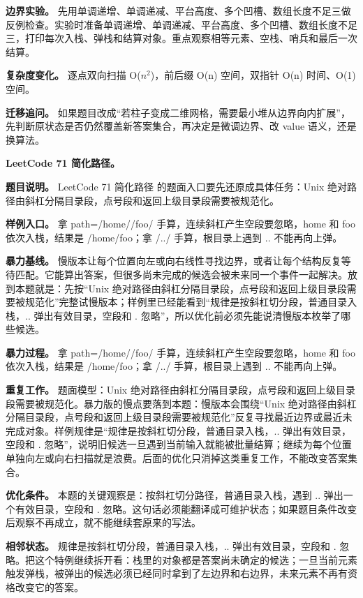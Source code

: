 \textbf{边界实验。} 先用单调递增、单调递减、平台高度、多个凹槽、数组长度不足三做反例检查。实验时准备单调递增、单调递减、平台高度、多个凹槽、数组长度不足三，打印每次入栈、弹栈和结算对象。重点观察相等元素、空栈、哨兵和最后一次结算。

\textbf{复杂度变化。} 逐点双向扫描 O(\ensuremath{n^{2}})，前后缀 O(n) 空间，双指针 O(n) 时间、O(1) 空间。

\textbf{迁移追问。} 如果题目改成“若柱子变成二维网格，需要最小堆从边界向内扩展”，先判断原状态是否仍然覆盖新答案集合，再决定是微调边界、改 value 语义，还是换算法。

\noindent\textbf{LeetCode 71 简化路径。}

\textbf{题目说明。} LeetCode 71 简化路径 的题面入口要先还原成具体任务：Unix 绝对路径由斜杠分隔目录段，点号段和返回上级目录段需要被规范化。

\textbf{样例入口。} 拿 path=/home//foo/ 手算，连续斜杠产生空段要忽略，home 和 foo 依次入栈，结果是 /home/foo；拿 /../ 手算，根目录上遇到 .. 不能再向上弹。

\textbf{暴力基线。} 慢版本让每个位置向左或向右线性寻找边界，或者让每个结构反复等待匹配。它能算出答案，但很多尚未完成的候选会被未来同一个事件一起解决。放到本题就是：先按“Unix 绝对路径由斜杠分隔目录段，点号段和返回上级目录段需要被规范化”完整试慢版本；样例里已经能看到“规律是按斜杠切分段，普通目录入栈，.. 弹出有效目录，空段和 . 忽略”，所以优化前必须先能说清慢版本枚举了哪些候选。

\textbf{暴力过程。} 拿 path=/home//foo/ 手算，连续斜杠产生空段要忽略，home 和 foo 依次入栈，结果是 /home/foo；拿 /../ 手算，根目录上遇到 .. 不能再向上弹。

\textbf{重复工作。} 题面模型：Unix 绝对路径由斜杠分隔目录段，点号段和返回上级目录段需要被规范化。暴力版的慢点要落到本题：慢版本会围绕“Unix 绝对路径由斜杠分隔目录段，点号段和返回上级目录段需要被规范化”反复寻找最近边界或最近未完成对象。样例规律是“规律是按斜杠切分段，普通目录入栈，.. 弹出有效目录，空段和 . 忽略”，说明旧候选一旦遇到当前输入就能被批量结算；继续为每个位置单独向左或向右扫描就是浪费。后面的优化只消掉这类重复工作，不能改变答案集合。

\textbf{优化条件。} 本题的关键观察是：按斜杠切分路径，普通目录入栈，遇到 .. 弹出一个有效目录，空段和 . 忽略。这句话必须能翻译成可维护状态；如果题目条件改变后观察不再成立，就不能继续套原来的写法。

\textbf{相邻状态。} 规律是按斜杠切分段，普通目录入栈，.. 弹出有效目录，空段和 . 忽略。把这个特例继续拆开看：栈里的对象都是答案尚未确定的候选；一旦当前元素触发弹栈，被弹出的候选必须已经同时拿到了左边界和右边界，未来元素不再有资格改变它的答案。

